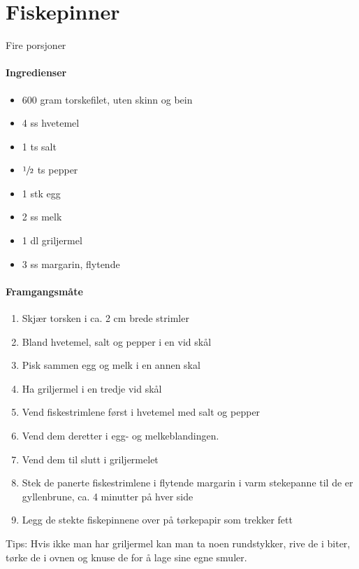 \section{Fiskepinner}
Fire porsjoner

\paragraph{Ingredienser}
\begin{itemize}[noitemsep]
	\item 600 gram  torskefilet, uten skinn og bein
	\item 4 ss hvetemel
	\item 1 ts salt
	\item $\sfrac{1}{2}$  ts pepper
	\item 1 stk egg
	\item 2 ss melk
	\item 1 dl griljermel
	\item 3 ss margarin, flytende
\end{itemize}


\paragraph{Framgangsmåte}
\begin{enumerate}[noitemsep]
	\item Skjær torsken i ca. 2 cm brede strimler
	\item Bland hvetemel, salt og pepper i en vid skål
	\item Pisk sammen egg og melk i en annen skal
	\item Ha griljermel i en tredje vid skål
	\item Vend fiskestrimlene først i hvetemel med salt og pepper
	\item Vend dem deretter i egg- og melkeblandingen.
	\item Vend dem til slutt i griljermelet
	\item Stek de panerte fiskestrimlene i flytende margarin i varm stekepanne til de er gyllenbrune, ca. 4 minutter på hver side
	\item Legg de stekte fiskepinnene over på tørkepapir som trekker fett
\end{enumerate}

Tips: Hvis ikke man har griljermel kan man ta noen rundstykker, rive de i biter, tørke de i ovnen og knuse de for å lage sine egne smuler.
